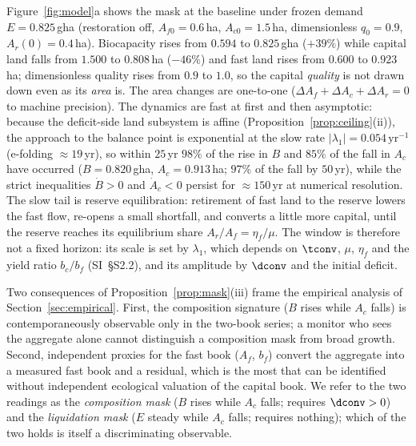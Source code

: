 Figure~\ref{fig:model}a shows the mask at the baseline under frozen demand $E=0.825$\,gha (restoration off, $A_{f0}=0.6$\,ha, $A_{c0}=1.5$\,ha, dimensionless $q_0=0.9$, $A_r(0)=0.4$\,ha). Biocapacity rises from $0.594$ to $0.825$\,gha ($+39\%$) while capital land falls from $1.500$ to $0.808$\,ha ($-46\%$) and fast land rises from $0.600$ to $0.923$\,ha; dimensionless quality rises from $0.9$ to $1.0$, so the capital \emph{quality} is not drawn down even as its \emph{area} is. The area changes are one-to-one ($\Delta A_f+\Delta A_c+\Delta A_r=0$ to machine precision). The dynamics are fast at first and then asymptotic: because the deficit-side land subsystem is affine (Proposition~\ref{prop:ceiling}(ii)), the approach to the balance point is exponential at the slow rate $|\lambda_1|=0.054\,\mathrm{yr}^{-1}$ (e-folding $\approx19$\,yr), so within $25$\,yr $98\%$ of the rise in $B$ and $85\%$ of the fall in $A_c$ have occurred ($B=0.820$\,gha, $A_c=0.913$\,ha; $97\%$ of the fall by $50$\,yr), while the strict inequalities $\dot B>0$ and $\dot A_c<0$ persist for $\approx150$\,yr at numerical resolution. The slow tail is reserve equilibration: retirement of fast land to the reserve lowers the fast flow, re-opens a small shortfall, and converts a little more capital, until the reserve reaches its equilibrium share $A_r/A_f=\eta_f/\mu$. The window is therefore not a fixed horizon: its scale is set by $\lambda_1$, which depends on $\tconv$, $\mu$, $\eta_f$ and the yield ratio $b_c/b_f$ (SI~\S S2.2), and its amplitude by $\dconv$ and the initial deficit.

Two consequences of Proposition~\ref{prop:mask}(iii) frame the empirical analysis of Section~\ref{sec:empirical}. First, the composition signature ($B$ rises while $A_c$ falls) is contemporaneously observable only in the two-book series; a monitor who sees the aggregate alone cannot distinguish a composition mask from broad growth. Second, independent proxies for the fast book ($A_f$, $b_f$) convert the aggregate into a measured fast book and a residual, which is the most that can be identified without independent ecological valuation of the capital book. We refer to the two readings as the \emph{composition mask} ($B$ rises while $A_c$ falls; requires $\dconv>0$) and the \emph{liquidation mask} ($E$ steady while $A_c$ falls; requires nothing); which of the two holds is itself a discriminating observable.

